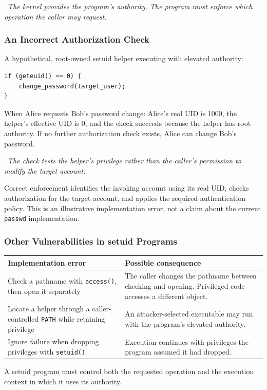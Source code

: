 \documentclass[hidelinks]{article}
\newcommand{\callout}[1]{\par\smallskip\noindent{\color{capri}$\blacktriangleright$}\ \textit{#1}\par\smallskip}
\begin{document}
\callout{The kernel provides the program's authority. The program must enforce which operation the caller may request.}

\subsubsection{An Incorrect Authorization Check}

A hypothetical, root-owned setuid helper executing with elevated authority:
\begin{verbatim}
if (geteuid() == 0) {
    change_password(target_user);
}
\end{verbatim}
When Alice requests Bob's password change: Alice's real UID is 1000, the helper's effective UID is 0, and the check succeeds because the helper has root authority. If no further authorization check exists, Alice can change Bob's password.

\callout{The check tests the helper's privilege rather than the caller's permission to modify the target account.}

Correct enforcement identifies the invoking account using its real UID, checks authorization for the target account, and applies the required authentication policy. This is an illustrative implementation error, not a claim about the current \texttt{passwd} implementation.

\subsubsection{Other Vulnerabilities in setuid Programs}

\begin{center}
\color{white}
\begin{tabular}{p{6.1cm}p{6.7cm}}
\hline
\textbf{Implementation error} & \textbf{Possible consequence}\\ \hline
Check a pathname with \texttt{access()}, then open it separately & The caller changes the pathname between checking and opening. Privileged code accesses a different object.\\[4pt]
Locate a helper through a caller-controlled \texttt{PATH} while retaining privilege & An attacker-selected executable may run with the program's elevated authority.\\[4pt]
Ignore failure when dropping privileges with \texttt{setuid()} & Execution continues with privileges the program assumed it had dropped.\\ \hline
\end{tabular}
\end{center}
A setuid program must control both the requested operation and the execution context in which it uses its authority.
\end{document}
